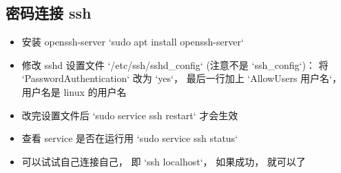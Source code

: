 
\begin{issues}
\issueDraft
\end{issues}

\subsection{密码连接 ssh}
\begin{itemize}
\item 安装 openssh-server `sudo apt install openssh-server`
\item 修改 sshd 设置文件 `/etc/ssh/sshd_config` (注意不是 `ssh_config`)： 将 `PasswordAuthentication` 改为 `yes`， 最后一行加上 `AllowUsers 用户名`， 用户名是 linux 的用户名
\item 改完设置文件后 `sudo service ssh restart` 才会生效
\item 查看 service 是否在运行用  `sudo service ssh status`
\item 可以试试自己连接自己， 即 `ssh localhost`， 如果成功， 就可以了
\end{itemize}


